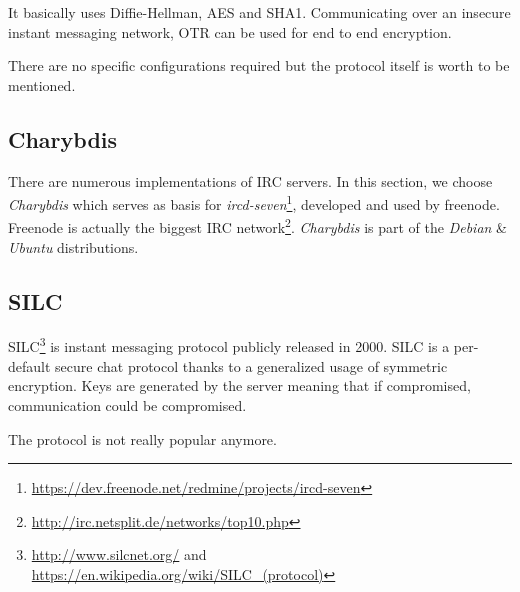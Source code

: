 It basically uses Diffie-Hellman, AES and SHA1. Communicating over an insecure instant messaging network, OTR can be used for end to end encryption.

There are no specific configurations required but the protocol itself is worth to be mentioned.


\subsection{Charybdis}
There are numerous implementations of IRC servers.  In this section, we choose \emph{Charybdis} which serves as basis for \emph{ircd-seven}\footnote{\url{https://dev.freenode.net/redmine/projects/ircd-seven}}, developed and used by freenode. Freenode is actually the biggest IRC network\footnote{\url{http://irc.netsplit.de/networks/top10.php}}. \emph{Charybdis} is part of the \emph{Debian} \& \emph{Ubuntu} distributions.


\subsection{SILC}

SILC\footnote{\url{http://www.silcnet.org/} and
\url{https://en.wikipedia.org/wiki/SILC_(protocol)}} is instant messaging
protocol publicly released in 2000. SILC is a per-default secure chat protocol
thanks to a generalized usage of symmetric encryption. Keys are generated by
the server meaning that if compromised, communication could be compromised.

The protocol is not really popular anymore.

